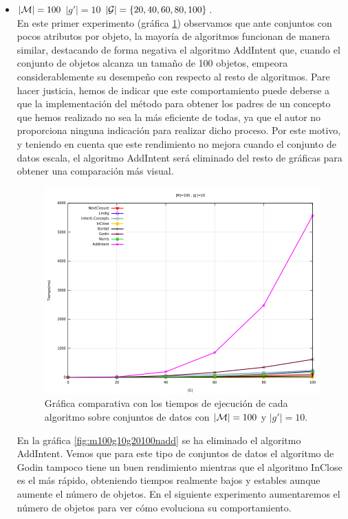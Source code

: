 \documentclass[oneside,openright,titlepage,numbers=noenddot,openany,headinclude,footinclude=true,
cleardoublepage=empty,abstractoff,BCOR=5mm,paper=a4,fontsize=12pt,main=spanish]{scrreprt}
\begin{document}
\begin{itemize}


\item \textbf{$|\mathcal{M}|=100$} \textbf{$|g'|=10$} \textbf{$|\mathcal{G}|=\{20,40,60,80,100\}$}.\\

En este primer experimento (gráfica \ref{fig:m100g10g20100}) observamos que ante conjuntos con pocos atributos por objeto, la mayoría de algoritmos funcionan de manera similar, destacando de forma negativa el algoritmo AddIntent que, cuando el conjunto de objetos alcanza un tamaño de 100 objetos, empeora considerablemente su desempeño con respecto al resto de algoritmos. Pare hacer justicia, hemos de indicar que este comportamiento puede deberse a que la implementación del método para obtener los padres de un concepto que hemos realizado no sea la más eficiente de todas, ya que el autor no proporciona ninguna indicación para realizar dicho proceso. Por este motivo, y teniendo en cuenta que este rendimiento no mejora cuando el conjunto de datos escala, el algoritmo AddIntent será eliminado del resto de gráficas para obtener una comparación más visual.

\begin{figure}[H]
  \centering
  \includegraphics[scale=0.5]{images/M100g10G20100.png}
\caption{Gráfica comparativa con los tiempos de ejecución de cada algoritmo sobre conjuntos de datos con $|\mathcal{M}|=100$ y $|g'|=10$.}
  \label{fig:m100g10g20100}
\end{figure}

En la gráfica \ref{fig:m100g10g20100nadd} se ha eliminado el algoritmo AddIntent. Vemos que para este tipo de conjuntos de datos el algoritmo de Godin tampoco tiene un buen rendimiento mientras que el algoritmo InClose es el más rápido, obteniendo tiempos realmente bajos y estables aunque aumente el número de objetos. En el siguiente experimento aumentaremos el número de objetos para ver cómo evoluciona su comportamiento.


\end{itemize}
\end{document}
